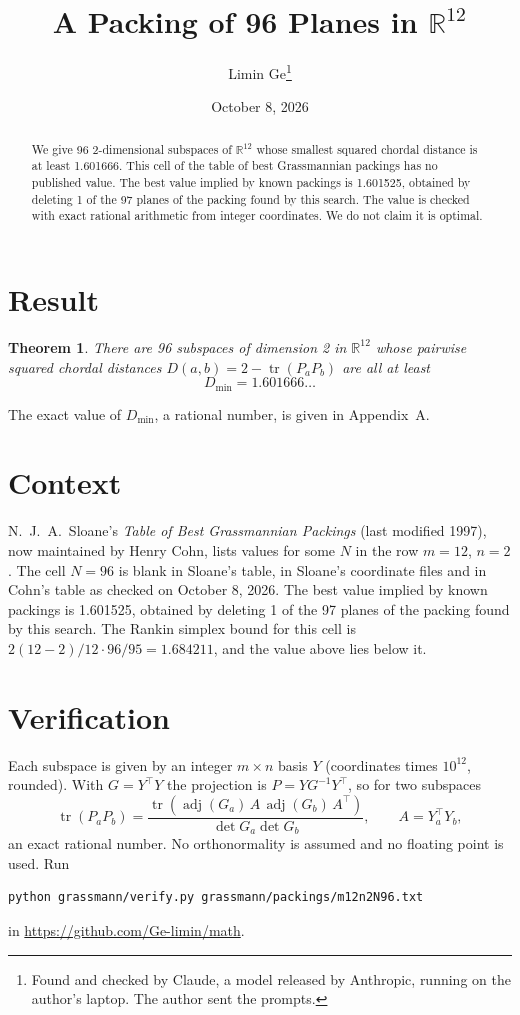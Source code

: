\documentclass[11pt,a4paper]{article}
\title{A Packing of 96 Planes in $\mathbb{R}^{12}$}
\author{Limin Ge\thanks{Found and checked by Claude, a model released by Anthropic, running on the author's laptop. The author sent the prompts.}}
\date{October 8, 2026}
\newtheorem*{theorem}{Theorem}
\begin{document}
\maketitle
\begin{abstract}
We give 96 2-dimensional subspaces of $\mathbb{R}^{12}$ whose smallest squared chordal distance is at least 1.601666. This cell of the table of best Grassmannian packings has no published value. The best value implied by known packings is 1.601525, obtained by deleting 1 of the 97 planes of the packing found by this search. The value is checked with exact rational arithmetic from integer coordinates. We do not claim it is optimal.
\end{abstract}

\section{Result}
\begin{theorem}
There are 96 subspaces of dimension 2 in $\mathbb{R}^{12}$ whose pairwise squared chordal distances $D(a,b) = 2 - \operatorname{tr}(P_aP_b)$ are all at least
\[ D_{\min} = 1.601666\ldots \]
\end{theorem}
The exact value of $D_{\min}$, a rational number, is given in Appendix~A.


\section{Context}
N.~J.~A.~Sloane's \emph{Table of Best Grassmannian Packings} (last modified 1997), now maintained by Henry Cohn, lists values for some $N$ in the row $m=12$, $n=2$. The cell $N=96$ is blank in Sloane's table, in Sloane's coordinate files and in Cohn's table as checked on October 8, 2026. The best value implied by known packings is 1.601525, obtained by deleting 1 of the 97 planes of the packing found by this search. The Rankin simplex bound for this cell is $2(12-2)/12\cdot 96/95 = 1.684211$, and the value above lies below it.


\section{Verification}
Each subspace is given by an integer $m\times n$ basis $Y$ (coordinates times $10^{12}$, rounded). With $G=Y^\top Y$ the projection is $P=YG^{-1}Y^\top$, so for two subspaces
\[ \operatorname{tr}(P_aP_b)=\frac{\operatorname{tr}(\operatorname{adj}(G_a)\,A\,\operatorname{adj}(G_b)\,A^\top)}{\det G_a\det G_b},\qquad A=Y_a^\top Y_b, \]
an exact rational number. No orthonormality is assumed and no floating point is used. Run
\begin{verbatim}
python grassmann/verify.py grassmann/packings/m12n2N96.txt
\end{verbatim}
in \url{https://github.com/Ge-limin/math}.
\end{document}
